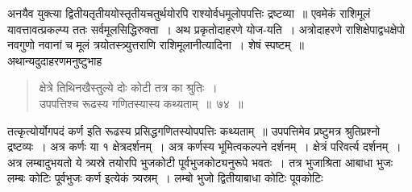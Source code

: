 \documentclass[11pt, openany]{book}
\begin{document}
 अनयैव युक्त्या द्वितीयतृतीययोस्तृतीयचतुर्थयोरपि राश्योर्वधमूलोपपत्तिः द्रष्टव्या~॥ एवमेकं राशिमूलं यावत्तावत्प्रकल्प्य ततः सर्वमूलसिद्धिरुक्ता~। अथ प्रकृतोदाहरणे योज-यति~। अत्रोदाहरणे राशिक्षेपाद्वधक्षेपो नवगुणो नवानां च मूलं त्रयोतस्त्र्युत्तराणि राशिमूलानीत्यादिना~। शेषं स्पष्टम्~॥ \\

\vspace{-3mm}
 अथान्यदुदाहरणमनुष्टुभाह\textendash
\begin{quote}
    \ex
      क्षेत्रे तिथिनखैस्तुल्ये दोः कोटी तत्र का श्रुतिः~। \\
 उपपत्तिश्च रूढस्य गणितस्यास्य कथ्यताम्~॥~७४~॥~
\end{quote}

तत्कृत्योर्योगपदं कर्ण इति रूढस्य प्रसिद्धगणितस्योपपत्तिः कथ्यताम्~॥ 
उपपत्तिमेव प्रष्टुमत्र श्रुतिप्रश्नो द्रष्टव्यः~। अत्र कर्णः या १ क्षेत्रदर्शनम्~।  अत्र कर्णस्य भूमित्वकल्पने दर्शनम्~।  क्षेत्रं परिवर्त्य दर्शनम्~।  अत्र लम्बादुभयतो ये त्र्यस्रे तयोरपि भुजकोटी पूर्वभुजकोट्यनुरूपे भवतः~। तत्र भुजाश्रिता आबाधा भुजः लम्बः कोटिः पूर्वभुजः कर्ण इत्येकं त्र्यस्रम्~। लम्बो भुजो द्वितीयाबाधा कोटिः पूवकोटिः
\end{document}
